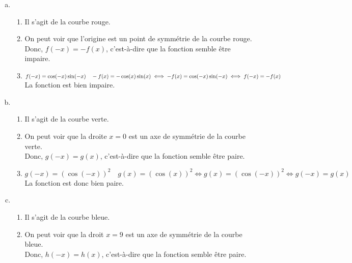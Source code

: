 \documentclass[12pt, a4paper]{article}
\begin{document}
\begin{Exercise}[number={81}]
\begin{center}
\end{center}
    \parbox{\linewidth}{}
    \begin{enumerate}[a)]
        \item   \begin{enumerate}[1)]
                    \item Il s'agit de la courbe rouge.
                    \item On peut voir que l'origine est un point de symmétrie de la courbe rouge. \\ Donc, $f(-x)=-f(x)$, c'est-à-dire que la fonction semble être impaire.
                    \item $f(-x)=\cos(-x)\sin(-x) \quad -f(x)=-\cos(x)\sin(x)\iff -f(x)=\cos(-x)\sin(-x)\\\iff f(-x)=-f(x)$ \quad La fonction est bien impaire.
                \end{enumerate}\smallbreak
        \item   \begin{enumerate}[1)]
                    \item Il s'agit de la courbe verte.
                    \item On peut voir que la droite $x=0$ est un axe de symmétrie de la courbe verte. \\ Donc, $g(-x)=g(x)$, c'est-à-dire que la fonction semble être paire.
                    \item $g(-x)=\left(\cos(-x)\right)^2 \quad g(x)=\left(\cos(x)\right)^2\iff g(x)=\left(\cos(-x)\right)^2\iff g(-x)=g(x)$ \\ La fonction est donc bien paire.
                \end{enumerate}\smallbreak
        \item   \begin{enumerate}[1)]
                    \item Il s'agit de la courbe bleue.
                    \item On peut voir que la droit $x=9$ est un axe de symmétrie de la courbe bleue. \\ Donc, $h(-x)=h(x)$, c'est-à-dire que la fonction semble être paire.

\end{enumerate}
\end{enumerate}
\end{Exercise}
\end{document}
